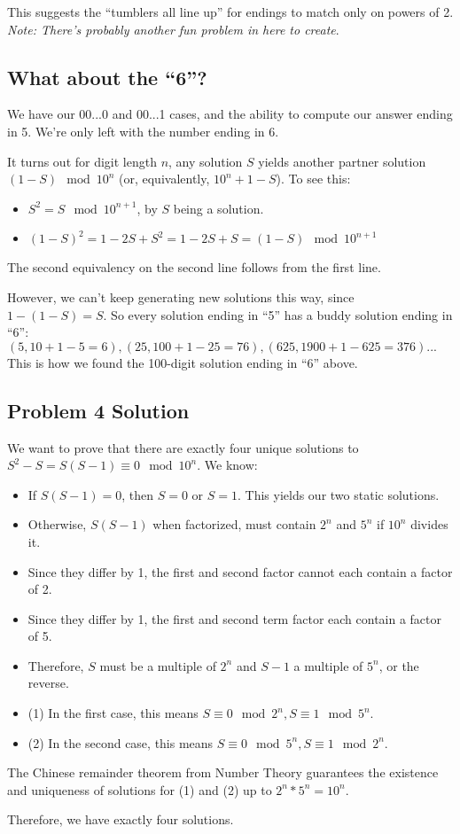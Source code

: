 \documentclass[11pt, oneside]{article} 	%
\begin{document}
This suggests the ``tumblers all line up'' for endings to match only on powers of 2.  \emph{Note: There's probably another fun problem in here to create}.

\subsection{What about the ``6''?}

We have our 00...0 and 00...1 cases, and the ability to compute our answer ending in 5.  We're only left with the number ending in 6.

It turns out for digit length $n$, any solution $S$ yields another partner solution $(1 - S) \mod 10^n$ (or, equivalently, $10^n + 1 - S$).  To see this:

\begin{itemize}
\item $S^2 = S  \mod 10^{n+1}$, by $S$ being a solution.
\item $(1-S)^2 = 1-2S+S^2 = 1-2S+S = (1-S) \mod 10^{n+1}$
\end{itemize}

The second equivalency on the second line follows from the first line.

However, we can't keep generating new solutions this way, since $1 - (1 - S) = S$.  So every solution ending in ``5'' has a buddy solution ending in ``6'': $(5, 10 + 1 - 5 = 6), (25, 100 + 1 - 25 = 76), (625, 1900 +1 - 625 = 376)...$ This is how we found the 100-digit solution ending in ``6'' above.

\subsection{Problem 4 Solution}

We want to prove that there are exactly four unique solutions to $S^2 - S = S(S-1) \equiv 0 \mod 10^n$.  We know:

\begin{itemize}
\item If $S(S-1) = 0$, then $S = 0$ or $S = 1$.  This yields our two static solutions.
\item Otherwise, $S(S-1)$ when factorized, must contain $2^n$ and $5^n$ if $10^n$ divides it.
\item Since they differ by 1, the first and second factor cannot each contain a factor of 2.
\item Since they differ by 1, the first and second term factor each contain a factor of 5.
\item Therefore, $S$ must be a multiple of $2^n$ and $S-1$ a multiple of $5^n$, or the reverse.
\item (1) In the first case, this means $S \equiv 0 \mod 2^n, S \equiv 1 \mod 5^n$.
\item (2) In the second case, this means $S \equiv 0 \mod 5^n, S \equiv 1 \mod 2^n$.
\end{itemize}

The Chinese remainder theorem from Number Theory guarantees the existence and uniqueness of solutions for (1) and (2) up to $2^n*5^n = 10^n$.

Therefore, we have exactly four solutions.
\end{document}
